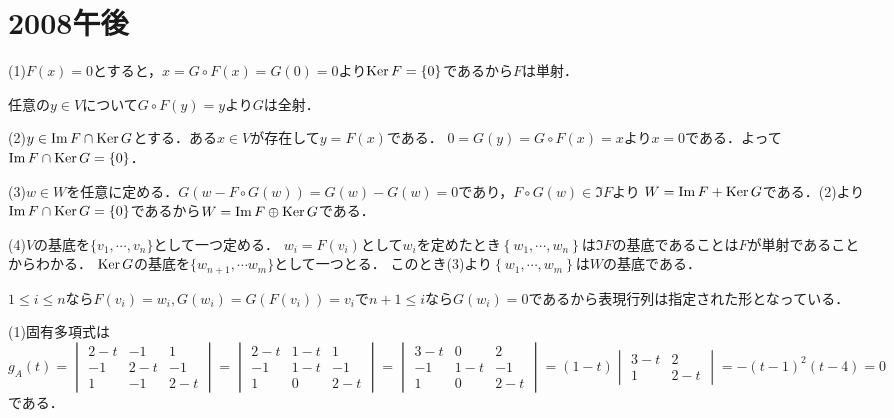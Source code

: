 \documentclass[
		book,
		head_space=20mm,
		foot_space=20mm,
		gutter=10mm,
		line_length=190mm
]{jlreq}
\begin{document}
\section{2008午後}
(1)$F(x)=0$とすると，$x=G\circ F(x)=G(0)=0$より$\mathop{\mathrm{Ker}} F=\{ 0\}$であるから$F$は単射．

任意の$y\in V$について$G\circ F(y)=y$より$G$は全射．

(2)$y\in \mathop{\mathrm{Im}} F\cap \mathop{\mathrm{Ker}} G$とする．ある$x\in V$が存在して$y=F(x)$である．
$0=G(y)=G\circ F(x)=x$より$x=0$である．よって$\mathop{\mathrm{Im}} F\cap \mathop{\mathrm{Ker}} G=\{ 0\}$．

(3)$w\in W$を任意に定める．$G(w-F\circ G(w))=G(w)-G(w)=0$であり，$F\circ G(w)\in \Im F$より
$W=\mathop{\mathrm{Im}} F+\mathop{\mathrm{Ker}} G$である．(2)より$\mathop{\mathrm{Im}} F\cap \mathop{\mathrm{Ker}} G=\{ 0\}$であるから$W=\mathop{\mathrm{Im}} F \oplus \mathop{\mathrm{Ker}} G$である．

(4)$V$の基底を$\{ v_1,\cdots ,v_n\}$として一つ定める．
$w_i=F(v_i)$として$w_i$を定めたとき$\left\{ w_1,\cdots,w_n \right\}$は$\Im F$の基底であることは$F$が単射であることからわかる．
$\mathop{\mathrm{Ker}} G$の基底を$\{ w_{n+1},\cdots w_m\}$として一つとる．
このとき(3)より$\left\{  w_1,\cdots,w_m \right\}$は$W$の基底である．

$1\le i\le n$なら$F(v_i)=w_i,G(w_i)=G(F(v_i))=v_i$で$n+1\le i$なら$G(w_i)=0$であるから表現行列は指定された形となっている．

(1)固有多項式は$g_A(t)=\begin{vmatrix}
2-t&-1&1\\
-1&2-t&-1\\
1&-1&2-t
\end{vmatrix}=\begin{vmatrix}
2-t&1-t&1\\
-1&1-t&-1\\
1&0&2-t
\end{vmatrix}=\begin{vmatrix}
3-t&0&2\\
-1&1-t&-1\\
1&0&2-t
\end{vmatrix}=(1-t)\begin{vmatrix}
	3-t&2\\
	1&2-t
\end{vmatrix}=-(t-1)^2(t-4)=0$である．
\end{document}
